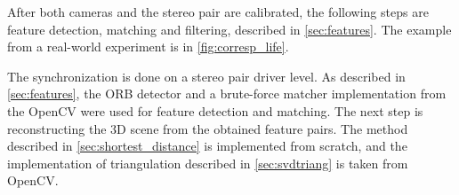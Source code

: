 After both cameras and the stereo pair are calibrated, the following steps are feature detection, matching and filtering, described in \autoref{sec:features}.
The example from a real-world experiment is in \autoref{fig:corresp_life}.

The synchronization is done on a stereo pair driver level.
As described in \autoref{sec:features}, the ORB detector and a brute-force matcher implementation from the OpenCV were used for feature detection and matching.
The next step is reconstructing the 3D scene from the obtained feature pairs.
The method described in \autoref{sec:shortest_distance} is implemented from scratch, and the implementation of triangulation described in \autoref{sec:svdtriang} is taken from OpenCV.